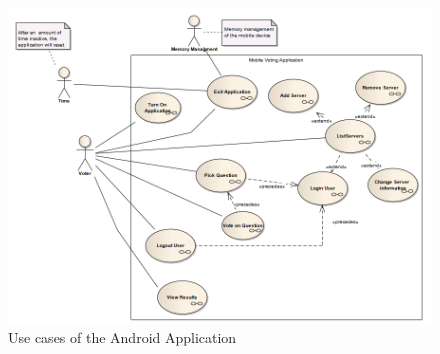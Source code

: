 \documentclass[11pt,twoside,a4paper]{book}
\begin{document}
\begin{figure}[h]
\begin{center}
\includegraphics[scale=1]{figures/AndroidUCs.PNG} 
\caption{Use cases of the Android Application}
\label{fig:Use Cases}
\end{center}
\end{figure}
\end{document}
